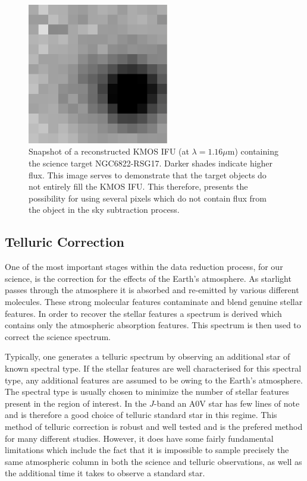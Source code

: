 \begin{figure}
 \centering
\includegraphics[width=0.55\textwidth]{ngc6822/N6822_RSG17-snapshot}
 \caption[IFU Snapshot]{
          Snapshot of a reconstructed KMOS IFU (at $\lambda = 1.16\mu$m) containing the science target NGC6822-RSG17.
          Darker shades indicate higher flux.
          This image serves to demonstrate that the target objects do not entirely fill the KMOS IFU.
          This therefore, presents the possibility for using several pixels which do not contain flux from the object in the sky subtraction process.
          }
 \label{fig:IFU_snapshot}
\end{figure}


\subsection{Telluric Correction} %
\label{sub:telluric_correction}

One of the most important stages within the data reduction process, for our science, is the correction for the effects of the Earth's atmosphere.
As starlight passes through the atmosphere it is absorbed and re-emitted by various different molecules.
These strong molecular features contaminate and blend genuine stellar features.
In order to recover the stellar features a spectrum is derived which contains only the atmospheric absorption features.
This spectrum is then used to correct the science spectrum.

Typically, one generates a telluric spectrum by observing an additional star of known spectral type.
If the stellar features are well characterised for this spectral type, any additional features are assumed to be owing to the Earth's atmosphere.
The spectral type is usually chosen to minimize the number of stellar features present in the region of interest.
In the $J$-band an A0V star has few lines of note and is therefore a good choice of telluric standard star in this regime.
This method of telluric correction is robust and well tested and is the prefered method for many different studies.
However, it does have some fairly fundamental limitations which include the fact that it is impossible to sample precisely the same atmospheric column in both the science and telluric observations, as well as the additional time it takes to observe a standard star.

